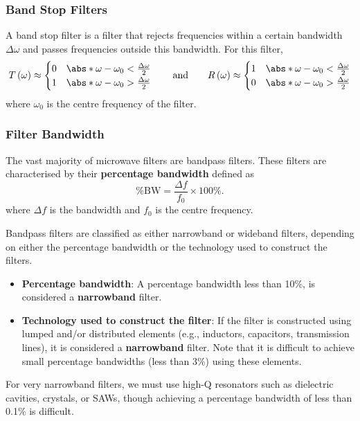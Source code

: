 \documentclass{article}
\begin{document}
\subsubsection{Band Stop Filters}
A band stop filter is a filter that rejects frequencies within a
certain bandwidth \(\Delta{\omega}\) and passes frequencies outside
this bandwidth. For this filter,
\begin{equation*}
    T\left( \omega \right) \approx
    \begin{cases}
        0 & \abs*{\omega - \omega_0} < \frac{\Delta{\omega}}{2} \\
        1 & \abs*{\omega - \omega_0} > \frac{\Delta{\omega}}{2}
    \end{cases}
    \qquad \text{and} \qquad
    R\left( \omega \right) \approx
    \begin{cases}
        1 & \abs*{\omega - \omega_0} < \frac{\Delta{\omega}}{2} \\
        0 & \abs*{\omega - \omega_0} > \frac{\Delta{\omega}}{2}
    \end{cases}
\end{equation*}
where \(\omega_0\) is the centre frequency of the filter.
\subsubsection{Filter Bandwidth}
The vast majority of microwave filters are bandpass filters. These
filters are characterised by their \textbf{percentage bandwidth}
defined as
\begin{equation*}
    \%\mathrm{BW} = \frac{\Delta{f}}{f_0} \times 100\%.
\end{equation*}
where \(\Delta{f}\) is the bandwidth and \(f_0\) is the centre frequency.

Bandpass filters are classified as either narrowband or wideband
filters, depending on either the percentage bandwidth or the technology
used to construct the filters.
\begin{itemize}
    \item \textbf{Percentage bandwidth}: A percentage bandwidth less
          than 10\%, is considered a \textbf{narrowband} filter.
    \item \textbf{Technology used to construct the filter}: If the filter
          is constructed using lumped and/or distributed elements (e.g.,
          inductors, capacitors, transmission lines), it is considered a
          \textbf{narrowband} filter. Note that it is difficult to achieve
          small percentage bandwidths (less than 3\%) using these elements.
\end{itemize}
For very narrowband filters, we must use high-Q resonators such as dielectric
cavities, crystals, or SAWs, though achieving a percentage bandwidth of
less than 0.1\% is difficult.
\end{document}
